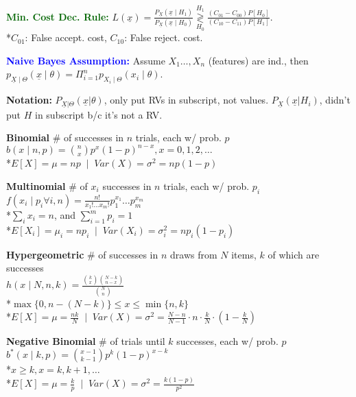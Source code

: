 \documentclass[5pt]{extarticle} %
\begin{document}
\begin{paracol}{3}
{    \textcolor{darkgreen}{\textbf{Min. Cost Dec. Rule:}} 
    $L(\underline{x}) = \frac{P_{\underline{X}} (\underline{x} \mid H_1)}{P_{\underline{X}} (\underline{x} \mid H_0)}\overset{H_1}{\underset{H_0}{\gtrless}} \frac{(C_{01} - C_{00}) P[H_0]}{(C_{10} - C_{11})P[H_1]}$. \\
    *$C_{01}$: False accept. cost, $C_{10}$: False reject. cost.

    \textcolor{blue}{\textbf{Naive Bayes Assumption:}} Assume $X_1 \ldots, X_n$ (features) are ind., then $p_{\underline{X} \mid \Theta} (\underline{x} \mid \theta) = \Pi_{i=1}^n p_{X_i \mid \Theta} (x_i \mid \theta)$.

    \textbf{Notation:} $P_{\underline{X} | \Theta} (\underline{x} | \theta)$, only put RVs in subscript, not values. $P_{\underline{X}} (\underline{x} | H_i)$, didn't put $H$ in subscript b/c it's not a RV.

    \textbf{Binomial} \# of successes in $n$ trials, each w/ prob. $p$ \\
    $ b(x \mid n, p) = \binom{n}{x} p^x (1 - p)^{n - x}, x = 0, 1, 2, \dots $ \\
    *$ E[X] = \mu = np \; \mid \; Var(X) = \sigma^2 = np(1 - p) $

    \textbf{Multinomial} \# of $x_i$ successes in $n$ trials, each w/ prob. $p_i$ \\
    $ f(x_i \mid p_i \forall i, n) = \frac{n!}{x_1! \dots x_m!} p_1^{x_1} \dots p_m^{x_m} $  \\
    *$ \sum_{i} x_i = n $, and $ \sum_{i=1}^{m} p_i = 1 $ \\
    *$ E[X_i] = \mu_i = np_i \; \mid \; Var(X_i) = \sigma^2_i = np_i(1 - p_i) $

    \textbf{Hypergeometric} \# of successes in $n$ draws from $N$ items, $k$ of which are successes \\
    $ h(x \mid N, n, k) = \frac{\binom{k}{x} \binom{N-k}{n-x}}{\binom{N}{n}}$ \\
    *$\max\{0, n - (N - k)\} \leq x \leq \min\{n, k\} $ \\
    *$E[X] = \mu = \frac{nk}{N} \; \mid \; Var(X) = \sigma^2 = \frac{N-n}{N-1} \cdot n \cdot \frac{k}{N} \cdot \left(1 - \frac{k}{N} \right) $

    \textbf{Negative Binomial} \# of trials until $k$ successes, each w/ prob. $p$ \\
    $ b^*(x \mid k, p) = \binom{x-1}{k-1} p^k (1 - p)^{x - k}$ \\
    *$x \geq k, x = k, k+1, \dots $ \\
    *$ E[X] = \mu = \frac{k}{p} \; \mid \; Var(X) = \sigma^2 = \frac{k(1 - p)}{p^2} $

}
\end{paracol}
\end{document}
